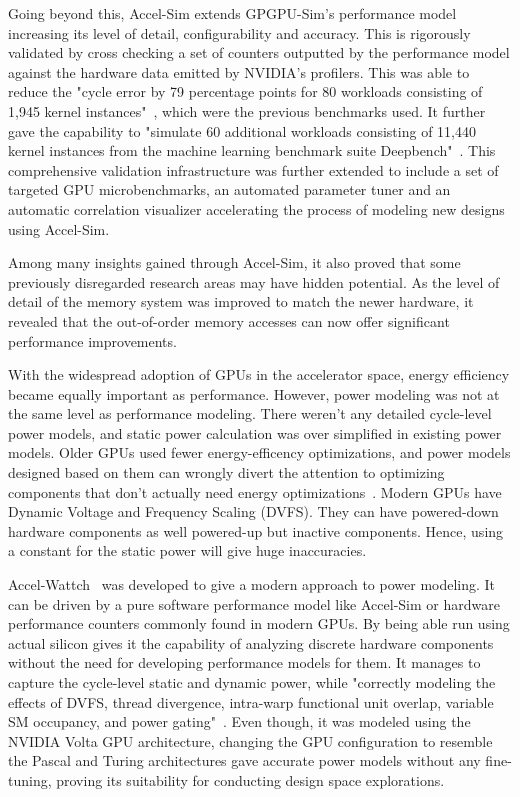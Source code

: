 \documentclass[conference]{IEEEtran}
\begin{document}
Going beyond this, Accel-Sim extends GPGPU-Sim's performance model increasing its level of detail, configurability and accuracy.
This is rigorously validated by cross checking a set of counters outputted by the performance model against the hardware data emitted by NVIDIA's profilers.
This was able to reduce the "cycle error by 79 percentage points for 80 workloads consisting of 1,945 kernel instances"~\cite{Khairy2020}, which were the previous benchmarks used.
It further gave the capability to "simulate 60 additional workloads consisting of 11,440 kernel instances from the machine learning benchmark suite Deepbench"~\cite{Khairy2020}.
This comprehensive validation infrastructure was further extended to include a set of targeted GPU microbenchmarks, an automated parameter tuner and an automatic correlation visualizer accelerating the process of modeling new designs using Accel-Sim.

Among many insights gained through Accel-Sim, it also proved that some previously disregarded research areas may have hidden potential.
As the level of detail of the memory system was improved to match the newer hardware, it revealed that the out-of-order memory accesses can now offer significant performance improvements.

With the widespread adoption of GPUs in the accelerator space, energy efficiency became equally important as performance.
However, power modeling was not at the same level as performance modeling.
There weren't any detailed cycle-level power models, and static power calculation was over simplified in existing power models.
Older GPUs used fewer energy-efficency optimizations, and power models designed based on them can wrongly divert the attention to optimizing components that don't actually need energy optimizations~\cite{Kandiah2021}.
Modern GPUs have Dynamic Voltage and Frequency Scaling (DVFS).
They can have powered-down hardware components as well powered-up but inactive components.
Hence, using a constant for the static power will give huge inaccuracies.

Accel-Wattch~\cite{Kandiah2021} was developed to give a modern approach to power modeling.
It can be driven by a pure software performance model like Accel-Sim or hardware performance counters commonly found in modern GPUs.
By being able run using actual silicon gives it the capability of analyzing discrete hardware components without the need for developing performance models for them.
It manages to capture the cycle-level static and dynamic power, while "correctly modeling the effects of DVFS, thread divergence, intra-warp functional unit overlap, variable SM occupancy, and power gating"~\cite{Kandiah2021}.
Even though, it was modeled using the NVIDIA Volta GPU architecture, changing the GPU configuration to resemble the Pascal and Turing architectures gave accurate power models without any fine-tuning, proving its suitability for conducting design space explorations.
\end{document}
